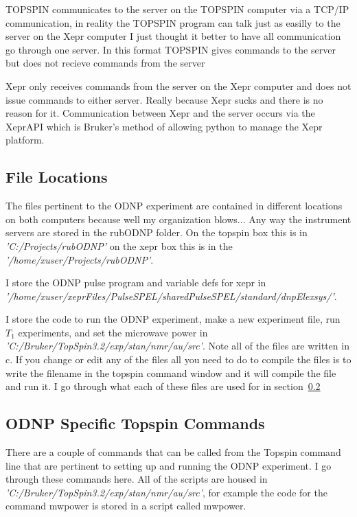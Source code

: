 \documentclass{article}
\newcommand{\fc}[1]{{\color{blue}\textit{'{#1}'}}}
\begin{document}
TOPSPIN communicates to the server on the TOPSPIN computer via a TCP/IP communication, in reality the TOPSPIN program can talk just as easilly to the server on the Xepr computer I just thought it better to have all communication go through one server. In this format TOPSPIN gives commands to the server but does not recieve commands from the server

Xepr only receives commands from the server on the Xepr computer and does not issue commands to either server. Really because Xepr sucks and there is no reason for it. Communication between Xepr and the server occurs via the XeprAPI which is Bruker's method of allowing python to manage the Xepr platform.


\subsection{File Locations}
\label{sec:fileLocs}
The files pertinent to the ODNP experiment are contained in different locations on both computers because well my organization blows... Any way the instrument servers are stored in the rubODNP folder. On the topspin box this is in \fc{C:/Projects/rubODNP} on the xepr box this is in the \fc{/home/xuser/Projects/rubODNP}.

I store the ODNP pulse program and variable defs for xepr in \fc{/home/xuser/xeprFiles/PulseSPEL/sharedPulseSPEL/standard/dnpElexsys/}.

I store the code to run the ODNP experiment, make a new experiment file, run $T_1$ experiments, and set the microwave power in \fc{C:/Bruker/TopSpin3.2/exp/stan/nmr/au/src}. Note all of the files are written in c. If you change or edit any of the files all you need to do to compile the files is to write the filename in the topspin command window and it will compile the file and run it. I go through what each of these files are used for in section~\ref{sec:odnpCommands}



\subsection{ODNP Specific Topspin Commands}
\label{sec:odnpCommands}

There are a couple of commands that can be called from the Topspin command line that are pertinent to setting up and running the ODNP experiment. I go through these commands here. All of the scripts are housed in \fc{C:/Bruker/TopSpin3.2/exp/stan/nmr/au/src}, for example the code for the command mwpower is stored in a script called mwpower.
\end{document}
